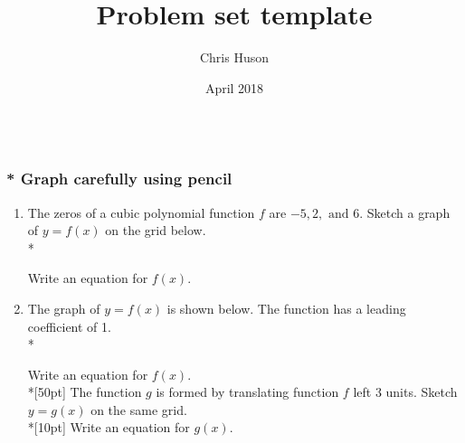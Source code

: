 \documentclass[12pt, oneside]{article}
\title{Problem set template}
\author{Chris Huson}
\date{April 2018}
\begin{document}

\subsubsection*{\\* \textnormal{Graph carefully using pencil}}

\begin{enumerate}
\subsubsection*{Do Now}

\item The zeros of a cubic polynomial function $f$ are  $-5, 2, \text{ and } 6$. Sketch a graph of $y = f(x)$ on the grid below.\\*
\begin{center}
\end{center}
Write an equation for $f(x)$.

\newpage

\item The graph of $y = f(x)$ is shown below. The function has a leading coefficient of 1.\\*
\begin{center}
\end{center}
Write an equation for $f(x)$.\\*[50pt]
The function $g$ is formed by translating function $f$ left 3 units. Sketch $y=g(x)$ on the same grid.\\*[10pt]
Write an equation for $g(x)$.


\end{enumerate}
\end{document}
